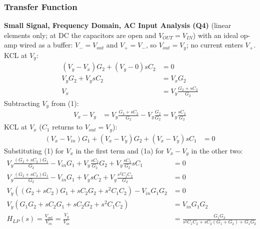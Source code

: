 \subsubsection{Transfer Function}
\textbf{Small Signal, Frequency Domain, AC Input Analysis (Q4)} (linear elements only; at DC
the capacitors are open and \(V_{OUT} = V_{IN}\)) with an ideal op-amp wired as a buffer: \(V_- = V_{out}\) and \(V_+ = V_-\), so
\(V_{out} = V_y\); no current enters \(V_+\).\\
KCL at \(V_y\):
\begin{align*}
  (V_y - V_x) G_2 + (V_y - 0) sC_2 &= 0 \\
  V_y G_2 + V_y sC_2 &= V_x G_2 \\
  V_x &= V_y \frac{G_2 + sC_2}{G_2} \tag{1}
\end{align*}
Subtracting \(V_y\) from (1):
\begin{align*}
  V_x - V_y &= V_y \frac{G_2 + sC_2}{G_2} - V_y\frac{G_2}{G_2} = V_y\frac{sC_2}{G_2} \tag{1a}
\end{align*}
KCL at \(V_x\) (\(C_1\) returns to \(V_{out} = V_y\)):
\begin{align*}
  (V_x - V_{in}) G_1 + (V_x - V_y) G_2 + (V_x - V_y) sC_1 &= 0 \tag{2}
\end{align*}
Substituting (1) for \(V_x\) in the first term and (1a) for \(V_x - V_y\) in the
other two:
\begin{align*}
  V_y\frac{(G_2 + sC_2) G_1}{G_2} - V_{in} G_1 + V_y\frac{sC_2}{G_2} G_2 + V_y\frac{sC_2}{G_2} sC_1 &= 0 \\
  V_y\frac{(G_2 + sC_2) G_1}{G_2} - V_{in} G_1 + V_y sC_2 + V_y\frac{s^2 C_1 C_2}{G_2} &= 0 \\
  V_y\left((G_2 + sC_2) G_1 + sC_2 G_2 + s^2 C_1 C_2\right) - V_{in} G_1 G_2 &= 0 \\
  V_y\left(G_1 G_2 + sC_2 G_1 + sC_2 G_2 + s^2 C_1 C_2\right) &= V_{in} G_1 G_2 \\
  H_{LP}(s) = \frac{V_{out}}{V_{in}} = \frac{V_y}{V_{in}} &= \frac{G_1 G_2}{s^2 C_1 C_2 + s C_2 (G_1 + G_2) + G_1 G_2} \tag{3}
\end{align*}

